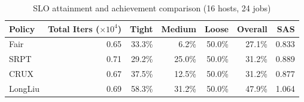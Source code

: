 \begin{table}[t]
\centering
\caption{SLO attainment and achievement comparison (16 hosts, 24 jobs)}
\label{tab:slo_16host}
\begin{tabular}{l|r|r|r|r|r|r}
\hline
Policy & Total Iters ($\times 10^4$) & Tight & Medium & Loose & Overall & SAS \\
\hline
Fair & 0.65 & 33.3\% & 6.2\% & 50.0\% & 27.1\% & 0.833 \\
SRPT & 0.71 & 29.2\% & 25.0\% & 50.0\% & 31.2\% & 0.889 \\
CRUX & 0.67 & 37.5\% & 12.5\% & 50.0\% & 31.2\% & 0.877 \\
LongLiu & 0.69 & 58.3\% & 31.2\% & 50.0\% & 47.9\% & 1.064 \\
\hline
\end{tabular}
\end{table}
